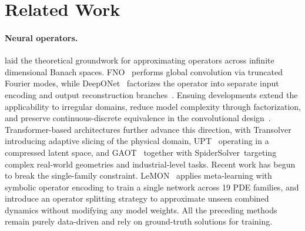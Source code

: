 \documentclass{article}
\begin{document}
\section{Related Work}
\label{sec:related}

\paragraph{Neural operators.}
\citet{kovachki2023neural} laid the theoretical groundwork for approximating operators across infinite dimensional Banach spaces. FNO~\cite{li2021fourier} performs global convolution via truncated Fourier modes, while DeepONet~\cite{lu2021deeponet} factorizes the operator into separate input encoding and output reconstruction branches~\cite{chen1995universal}. Ensuing developments extend the applicability to irregular domains, reduce model complexity through factorization, and preserve continuous-discrete equivalence in the convolutional design~\cite{li2023geo,tran2023ffno,raonic2024cno}. Transformer-based architectures further advance this direction, with Transolver~\cite{wu2024transolver} introducing adaptive slicing of the physical domain, UPT~\cite{alkin2024upt} operating in a compressed latent space, and GAOT~\cite{wen2025gaot} together with SpiderSolver~\cite{qi2025spidersolver}targeting complex real-world geometries and industrial-level tasks. Recent work has begun to break the single-family constraint. LeMON~\cite{sun2024lemon} applies meta-learning with symbolic operator encoding to train a single network across 19 PDE families, and \citet{serrano2026splitting} introduce an operator splitting strategy to approximate unseen combined dynamics without modifying any model weights. All the preceding methods remain purely data-driven and rely on ground-truth solutions for training.
\end{document}
